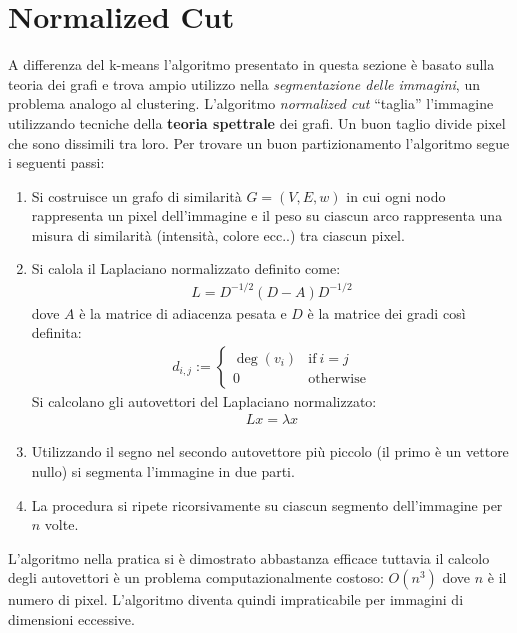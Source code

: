 \section{Normalized Cut} %
\label{sec:normalized_cut}
A differenza del k-means l'algoritmo presentato in questa sezione è basato sulla teoria dei grafi e trova ampio utilizzo nella \emph{segmentazione delle immagini}, un problema analogo al clustering.
L'algoritmo \emph{normalized cut} “taglia” l'immagine utilizzando tecniche della \textbf{teoria spettrale} dei grafi. Un buon taglio divide pixel che sono dissimili tra loro. Per trovare un buon partizionamento l'algoritmo segue i seguenti passi:
\begin{enumerate}
	\item Si costruisce un grafo di similarità $G=(V, E, w)$ in cui ogni nodo rappresenta un pixel dell'immagine e il peso su ciascun arco rappresenta una misura di similarità (intensità, colore ecc..) tra ciascun pixel.
	\item Si calola il Laplaciano normalizzato definito come:
	\begin{align}
		L = D ^ {- 1 / 2} (D - A) D ^ {- 1 / 2}
	\end{align}
	dove $A$ è la matrice di adiacenza pesata e $D$ è la matrice dei gradi così definita:
	\begin{align}
		d_{i,j}:=
		\begin{cases} 
		\deg(v_i) & \mbox{if}\ i = j \\
		0 & \mbox{otherwise}
		\end{cases}
	\end{align}
	Si calcolano gli autovettori del Laplaciano normalizzato:
	\begin{align}
		L x = \lambda x
	\end{align}
	
	\item Utilizzando il segno nel secondo autovettore più piccolo (il primo è un vettore nullo) si segmenta l'immagine in due parti.

	\item La procedura si ripete ricorsivamente su ciascun segmento dell'immagine per $n$ volte.
\end{enumerate}

L'algoritmo nella pratica si è dimostrato abbastanza efficace tuttavia il calcolo degli autovettori è un problema computazionalmente costoso: $O(n^3)$ dove $n$ è il numero di pixel. L'algoritmo diventa quindi impraticabile per immagini di dimensioni eccessive.\\

